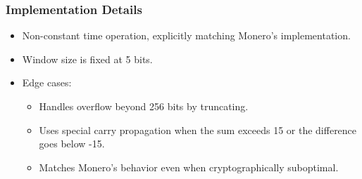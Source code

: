 \subsubsection{Implementation Details}

\begin{itemize}
  \item Non-constant time operation, explicitly matching Monero's implementation.  %
  \item Window size is fixed at 5 bits.  %
  \item Edge cases:
    \begin{itemize}
      \item Handles overflow beyond 256 bits by truncating.  %
      \item Uses special carry propagation when the sum exceeds 15 or the difference goes below -15.  %
      \item Matches Monero's behavior even when cryptographically suboptimal.%
    \end{itemize}
\end{itemize}

